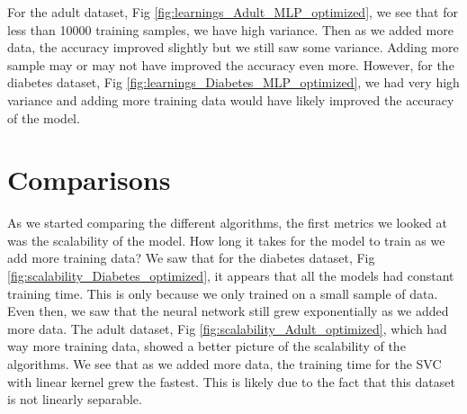 \documentclass[11pt, twocolumn]{article}
\begin{document}
    For the adult dataset, Fig \ref{fig:learnings_Adult_MLP_optimized}, we see that for less than 10000 training samples, we have high variance. Then as we added more data, the accuracy improved slightly but we still saw some variance. Adding more sample may or may not have improved the accuracy even more. However, for the diabetes dataset, Fig \ref{fig:learnings_Diabetes_MLP_optimized}, we had very high variance and adding more training data would have likely improved the accuracy of the model.

    \section{Comparisons}

    As we started comparing the different algorithms, the first metrics we looked at was the scalability of the model. How long it takes for the model to train as we add more training data? We saw that for the diabetes dataset, Fig \ref{fig:scalability_Diabetes_optimized}, it appears that all the models had constant training time. This is only because we only trained on a small sample of data. Even then, we saw that the neural network still grew exponentially as we added more data. The adult dataset, Fig \ref{fig:scalability_Adult_optimized}, which had way more training data, showed a better picture of the scalability of the algorithms. We see that as we added more data, the training time for the SVC with linear kernel grew the fastest. This is likely due to the fact that this dataset is not linearly separable.
\end{document}
